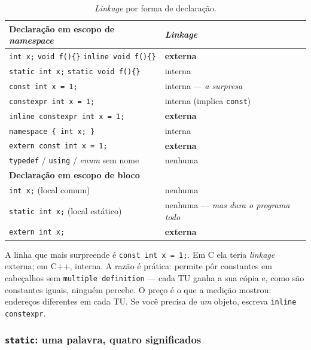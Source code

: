 \begin{table}[htbp]
\centering
\caption{\emph{Linkage} por forma de declaração.}
\label{tab:linkage-formas}
\footnotesize
\begin{tabular}{@{}ll@{}}
\toprule
\textbf{Declaração em escopo de \emph{namespace}} & \textbf{\emph{Linkage}} \\
\midrule
\texttt{int x;} \quad \texttt{void f()\{\}} \quad \texttt{inline void f()\{\}} & \textbf{externa} \\
\texttt{static int x;} \quad \texttt{static void f()\{\}} & interna \\
\texttt{const int x = 1;}            & interna \quad --- \emph{a surpresa} \\
\texttt{constexpr int x = 1;}        & interna (implica \texttt{const}) \\
\texttt{inline constexpr int x = 1;} & \textbf{externa} \\
\texttt{namespace \{ int x; \}}      & interna \\
\texttt{extern const int x = 1;}     & \textbf{externa} \\
\texttt{typedef} / \texttt{using} / \emph{enum} sem nome & nenhuma \\
\midrule
\textbf{Declaração em escopo de bloco} & \\
\midrule
\texttt{int x;} (local comum)           & nenhuma \\
\texttt{static int x;} (local estático) & nenhuma --- \emph{mas dura o programa todo} \\
\texttt{extern int x;}                  & \textbf{externa} \\
\bottomrule
\end{tabular}
\end{table}

A linha que mais surpreende é \texttt{const int x = 1;}. Em C ela teria
\emph{linkage} externa; em C++, interna. A razão é prática: permite pôr
constantes em cabeçalhos sem \texttt{multiple definition} --- cada TU ganha a
sua cópia e, como são constantes iguais, ninguém percebe. O preço é o que a
medição mostrou: endereços diferentes em cada TU. Se você precisa de \emph{um}
objeto, escreva \texttt{inline constexpr}.

\subsubsection{\texttt{static}: uma palavra, quatro significados}

